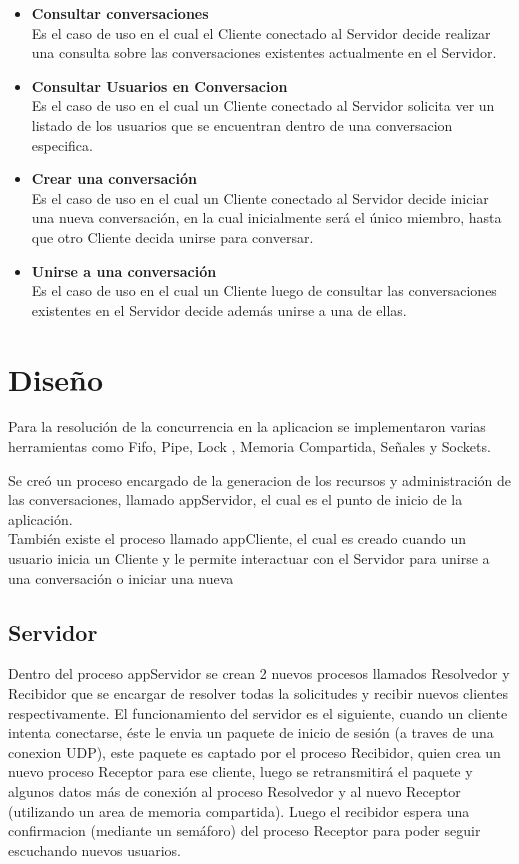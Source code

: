 \documentclass[a4paper,12pt,titlepage]{article}
\begin{document}
\begin{itemize}
\item \textbf{Consultar conversaciones}\\
  Es el caso de uso en el cual el Cliente conectado al Servidor decide realizar una consulta sobre las conversaciones
  existentes actualmente en el Servidor.
\item \textbf{Consultar Usuarios en Conversacion}\\ 
  Es el caso de uso en el cual un Cliente conectado al Servidor solicita ver un listado de los usuarios que se encuentran dentro de una conversacion especifica.
\item \textbf{Crear una conversación}\\ 
  Es el caso de uso en el cual un Cliente conectado al Servidor decide iniciar una nueva conversación, en la cual inicialmente
  será el único miembro, hasta que otro Cliente decida unirse para conversar.
\item \textbf{Unirse a una conversación}\\
  Es el caso de uso en el cual un Cliente luego de consultar las conversaciones existentes en el Servidor decide además
  unirse a una de ellas.\\
\end{itemize} 


\newpage
\section{Diseño}

Para la resolución de la concurrencia en la aplicacion se implementaron varias herramientas como Fifo, Pipe, Lock , 
Memoria Compartida, Señales y Sockets.

Se creó un proceso encargado de la generacion de los recursos y administración de las conversaciones, llamado 
appServidor, el cual es el punto de inicio de la aplicación.\\

También existe el proceso llamado appCliente, el cual es creado cuando un usuario inicia un Cliente y le permite interactuar con
el Servidor para unirse a una conversación o iniciar una nueva\\

\subsection{Servidor}
Dentro del proceso appServidor se crean 2 nuevos procesos llamados Resolvedor y Recibidor que se encargar de resolver todas la solicitudes 
y recibir nuevos clientes respectivamente.
El funcionamiento del servidor es el siguiente, cuando un cliente intenta conectarse, éste le envia un paquete de inicio de sesión (a traves 
de una conexion UDP), este paquete es captado por el proceso Recibidor, quien crea un nuevo proceso Receptor para ese cliente, luego 
se retransmitirá el paquete y algunos datos más de conexión al proceso Resolvedor y al nuevo Receptor (utilizando un area de memoria compartida). 
Luego el recibidor espera una confirmacion (mediante un semáforo) del proceso Receptor para poder seguir escuchando nuevos usuarios.\\
\end{document}
